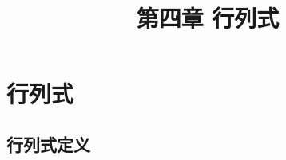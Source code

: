 

\renewcommand{\mydate}{2025年03月18号\quad 第七次课}

\makeatletter
\ifodd\value{page}
\else
\begin{frame}[plain]
\end{frame}
\fi
\makeatother


\section{行列式}


\title{第四章 \quad 行列式}
\author{}
\date{}


\frame{\titlepage}


\subsection{行列式定义}



